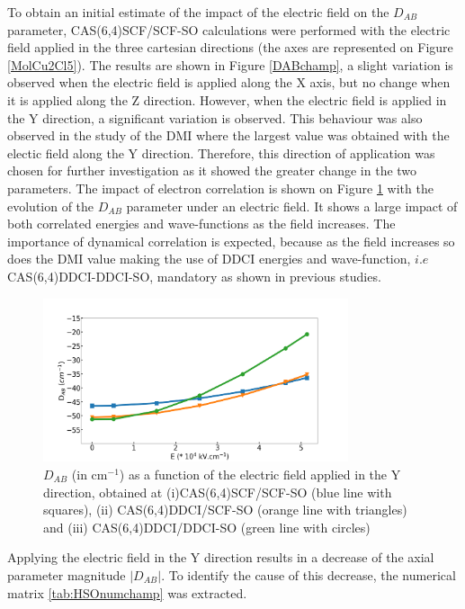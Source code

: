 \documentclass[12pt]{report}
\numberwithin{equation}{section}
\begin{document}
To obtain an initial estimate of the impact of the electric field on the $D_{AB}$ parameter, CAS(6,4)SCF/SCF-SO calculations were performed with the electric field applied in the three cartesian directions (the axes are represented on Figure \ref{MolCu2Cl5}).
The results are shown in Figure \ref{DABchamp}, a slight variation is observed when the electric field is applied along the X axis, but no change when it is applied along the Z direction.
However, when the electric field is applied in the Y direction, a significant variation is observed.
This behaviour was also observed in the study of the DMI where the largest value was obtained with the electic field along the Y direction.
Therefore, this direction of application was chosen for further investigation as it showed the greater change in the two parameters.
The impact of electron correlation is shown on Figure \ref{DABcorrelation} with the evolution of the $D_{AB}$ parameter under an electric field. 
It shows a large impact of both correlated energies and wave-functions as the field increases.
The importance of dynamical correlation is expected, because as the field increases so does the DMI value making the use of DDCI energies and wave-function, $i.e$ CAS(6,4)DDCI-DDCI-SO, mandatory as shown in previous studies.

\begin{figure}[!ht]
    \centering
    \includegraphics[width=0.8\textwidth]{Images/DABcorrelation.png}
    \caption{$D_{AB}$ (in cm$^{-1}$) as a function of the electric field applied in the Y direction, obtained at (i)CAS(6,4)SCF/SCF-SO (blue line with squares), (ii) CAS(6,4)DDCI/SCF-SO (orange line with triangles) and (iii) CAS(6,4)DDCI/DDCI-SO (green line with circles)}
    \label{DABcorrelation}
\end{figure}

Applying the electric field in the Y direction results in a decrease of the axial parameter magnitude $|D_{AB}|$.
To identify the cause of this decrease, the numerical matrix \ref{tab:HSOnumchamp} was extracted.
\end{document}
